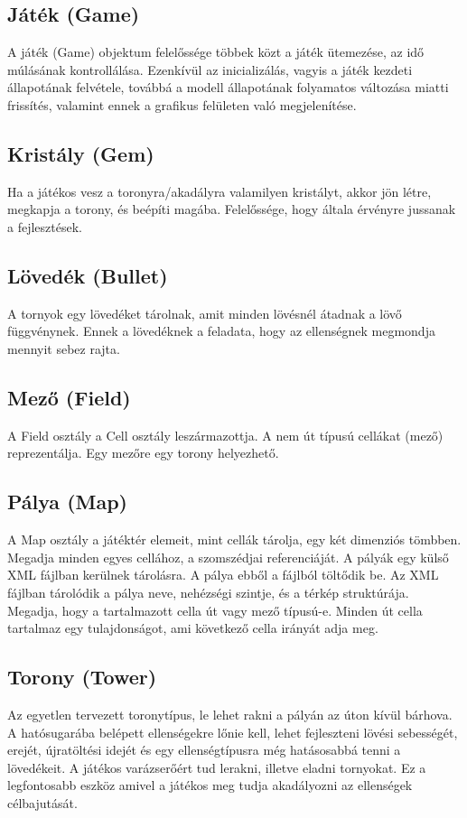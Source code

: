 \subsection{Játék (Game)}
A játék (Game) objektum felelőssége többek közt a játék ütemezése, az idő múlásának kontrollálása. Ezenkívül az inicializálás, vagyis a játék kezdeti állapotának felvétele, továbbá a modell állapotának folyamatos változása miatti frissítés, valamint ennek a grafikus felületen való megjelenítése.

\subsection{Kristály (Gem)}
	Ha a játékos vesz a toronyra/akadályra valamilyen kristályt, akkor jön létre, megkapja a torony, és beépíti magába. Felelőssége, hogy általa érvényre jussanak a fejlesztések. 
\subsection{Lövedék (Bullet)}
	A tornyok egy lövedéket tárolnak, amit minden lövésnél átadnak a lövő függvénynek. Ennek a lövedéknek a feladata, hogy az ellenségnek megmondja mennyit sebez rajta.
\subsection{Mező (Field)}
A Field osztály a Cell osztály leszármazottja. A nem út típusú cellákat (mező) reprezentálja. Egy mezőre egy torony helyezhető. 

\subsection{Pálya (Map)}
A Map osztály a játéktér elemeit, mint cellák tárolja, egy két dimenziós tömbben. Megadja minden egyes cellához, a szomszédjai referenciáját. A pályák egy külső XML fájlban kerülnek tárolásra. A pálya ebből a fájlból töltődik be. Az XML fájlban tárolódik a pálya neve, nehézségi szintje, és a térkép struktúrája. Megadja, hogy a tartalmazott cella út vagy mező típusú-e. Minden út cella tartalmaz egy tulajdonságot, ami következő cella irányát adja meg.


\subsection{Torony (Tower)}
	Az egyetlen tervezett toronytípus, le lehet rakni a pályán az úton kívül bárhova. A hatósugarába belépett ellenségekre lőnie kell, lehet fejleszteni lövési sebességét, erejét, újratöltési idejét és egy ellenségtípusra még hatásosabbá tenni a lövedékeit. A játékos varázserőért tud lerakni, illetve eladni tornyokat. Ez a legfontosabb eszköz amivel a játékos meg tudja akadályozni az ellenségek célbajutását.
